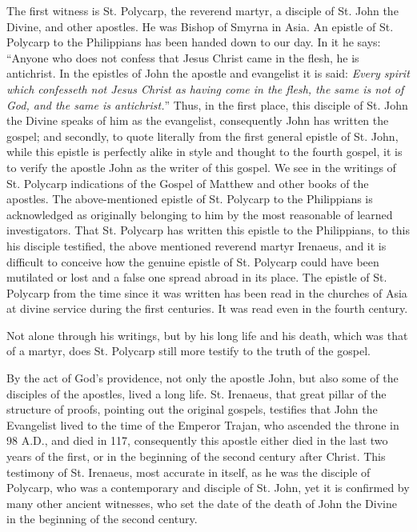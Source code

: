 The first witness is St. Polycarp, the reverend martyr, a disciple of St. John the Divine, and other apostles. He was Bishop of Smyrna in Asia. An epistle of St. Polycarp to the Philippians has been handed down to our day. In it he says: ``Anyone who does not confess that Jesus Christ came in the flesh, he is antichrist. In the epistles of John the apostle and evangelist it is said: \textit{Every spirit which confesseth not Jesus Christ as having come in the flesh, the same is not of God, and the same is antichrist.}'' Thus, in the first place, this disciple of St. John the Divine speaks of him as the evangelist, consequently John has written the gospel; and secondly, to quote literally from the first general epistle of St. John, while this epistle is perfectly alike in style and thought to the fourth gospel, it is to verify the apostle John as the writer of this gospel. We see in the writings of St. Polycarp indications of the Gospel of Matthew and other books of the apostles. The above-mentioned epistle of St. Polycarp to the Philippians is acknowledged as originally belonging to him by the most reasonable of learned investigators. That St. Polycarp has written this epistle to the Philippians, to this his disciple testified, the above mentioned reverend martyr Irenaeus, and it is difficult to conceive how the genuine epistle of St. Polycarp could have been mutilated or lost and a false one spread abroad in its place. The epistle of St. Polycarp from the time since it was written has been read in the churches of Asia at divine service during the first centuries. It was read even in the fourth century.

Not alone through his writings, but by his long life and his death, which was that of a martyr, does St. Polycarp still more testify to the truth of the gospel.

By the act of God's providence, not only the apostle John, but also some of the disciples of the apostles, lived a long life. St. Irenaeus, that great pillar of the structure of proofs, pointing out the original gospels, testifies that John the Evangelist lived to the time of the Emperor Trajan, who ascended the throne in 98 A.D., and died in 117, consequently this apostle either died in the last two years of the first, or in the beginning of the second century after Christ. This testimony of St. Irenaeus, most accurate in itself, as he was the disciple of Polycarp, who was a contemporary and disciple of St. John, yet it is confirmed by many other ancient witnesses, who set the date of the death of John the Divine in the beginning of the second century.

